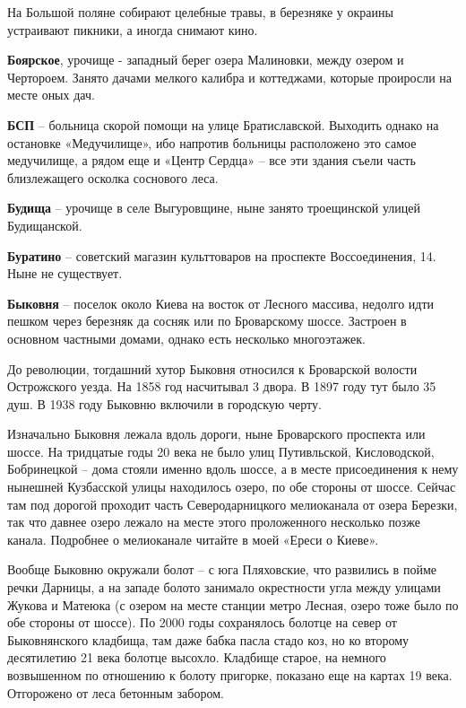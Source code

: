 На Большой поляне собирают целебные травы, в березняке у окраины устраивают пикники, а иногда снимают кино.\\

\medskip

\textbf{Боярское}, урочище - западный берег озера Малиновки, между озером и Чертороем. Занято дачами мелкого калибра и коттеджами, которые проиросли на месте оных дач.\\

\medskip


\textbf{БСП} – больница скорой помощи на улице Братиславской. Выходить однако на остановке «Медучилище», ибо напротив больницы расположено это самое медучилище, а рядом еще и «Центр Сердца» – все эти здания съели часть близлежащего осколка соснового леса.\\

\medskip

\textbf{Будища} – урочище в селе Выгуровщине, ныне занято троещинской улицей Будищанской.\\

\medskip

\textbf{Буратино} – советский магазин культтоваров на проспекте Воссоединения, 14. Ныне не существует.\\

\medskip

\textbf{Быковня} – поселок около Киева на восток от Лесного массива, недолго идти пешком через березняк да сосняк или по Броварскому шоссе. Застроен в основном частными домами, однако есть несколько многоэтажек.

До революции, тогдашний хутор Быковня относился к Броварской волости Острожского уезда. На 1858 год насчитывал 3 двора. В 1897 году тут было 35 душ. В 1938 году Быковню включили в городскую черту.
 
Изначально Быковня лежала вдоль дороги, ныне Броварского проспекта или шоссе. На тридцатые годы 20 века не было улиц Путивльской, Кисловодской, Бобринецкой – дома стояли именно вдоль шоссе, а в месте присоединения к нему нынешней Кузбасской улицы находилось озеро, по обе стороны от шоссе. Сейчас там под дорогой проходит часть Северодарницкого мелиоканала от озера Березки, так что давнее озеро лежало на месте этого проложенного несколько позже канала. Подробнее о мелиоканале читайте в моей «Ереси о Киеве».
   
Вообще Быковню окружали болот – с юга Пляховские, что развились в пойме речки Дарницы, а на западе болото занимало окрестности угла между улицами Жукова и Матеюка (с озером на месте станции метро Лесная, озеро тоже было по обе стороны от шоссе). По 2000 годы сохранялось болотце на север от Быковнянского кладбища, там даже бабка пасла стадо коз, но ко второму десятилетию 21 века болотце высохло. Кладбище старое, на немного возвышенном по отношению к болоту пригорке, показано еще на картах 19 века. Отгорожено от леса бетонным забором.

